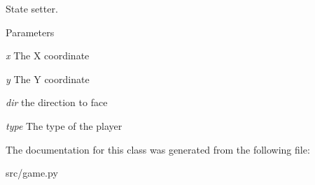 State setter. 


\begin{DoxyParams}{Parameters}
\item[{\em x}]The X coordinate \item[{\em y}]The Y coordinate \item[{\em dir}]the direction to face \item[{\em type}]The type of the player \end{DoxyParams}


The documentation for this class was generated from the following file:\begin{DoxyCompactItemize}
\item 
src/game.py\end{DoxyCompactItemize}
